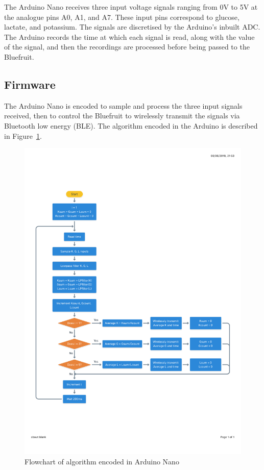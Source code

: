 The Arduino Nano receives three input voltage signals ranging from 0V to 5V at the analogue pins A0, A1, and A7. These input pins correspond to glucose, lactate, and potassium. The signals are discretised by the Arduino's inbuilt ADC. The Arduino records the time at which each signal is read, along with the value of the signal, and then the recordings are processed before being passed to the Bluefruit.



\subsection{Firmware}
The Arduino Nano is encoded to sample and process the three input signals received, then to control the Bluefruit to wirelessly transmit the signals via Bluetooth low energy (BLE). The algorithm encoded in the Arduino is described in Figure~\ref{fig: psuedocode}.

\begin{figure}[t!]
\centering
\includegraphics[trim={1cm 5cm 1cm  4cm}, clip, width=1\textwidth]{./figures/psuedocode.pdf}
\captionsetup{justification=centering}
\caption{Flowchart of algorithm encoded in Arduino Nano}
\label{fig: psuedocode}
\end{figure}


